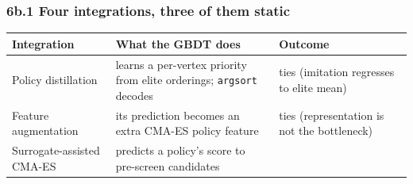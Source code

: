 \documentclass[
  11pt,
]{article}
\begin{document}
\hypertarget{b.1-four-integrations-three-of-them-static}{%
\subsubsection{6b.1 Four integrations, three of them
static}\label{b.1-four-integrations-three-of-them-static}}

\begin{longtable}[]{@{}lll@{}}
\toprule
\begin{minipage}[b]{0.30\columnwidth}\raggedright
Integration\strut
\end{minipage} & \begin{minipage}[b]{0.30\columnwidth}\raggedright
What the GBDT does\strut
\end{minipage} & \begin{minipage}[b]{0.30\columnwidth}\raggedright
Outcome\strut
\end{minipage}\tabularnewline
\midrule
\endhead
\begin{minipage}[t]{0.30\columnwidth}\raggedright
Policy distillation\strut
\end{minipage} & \begin{minipage}[t]{0.30\columnwidth}\raggedright
learns a per-vertex priority from elite orderings; \texttt{argsort}
decodes\strut
\end{minipage} & \begin{minipage}[t]{0.30\columnwidth}\raggedright
ties (imitation regresses to elite mean)\strut
\end{minipage}\tabularnewline
\begin{minipage}[t]{0.30\columnwidth}\raggedright
Feature augmentation\strut
\end{minipage} & \begin{minipage}[t]{0.30\columnwidth}\raggedright
its prediction becomes an extra CMA-ES policy feature\strut
\end{minipage} & \begin{minipage}[t]{0.30\columnwidth}\raggedright
ties (representation is not the bottleneck)\strut
\end{minipage}\tabularnewline
\begin{minipage}[t]{0.30\columnwidth}\raggedright
Surrogate-assisted CMA-ES\strut
\end{minipage} & \begin{minipage}[t]{0.30\columnwidth}\raggedright
predicts a policy's score to pre-screen candidates\strut
\end{minipage} & \begin{minipage}[t]{0.30\columnwidth}\raggedright

\end{minipage}
\end{longtable}
\end{document}

